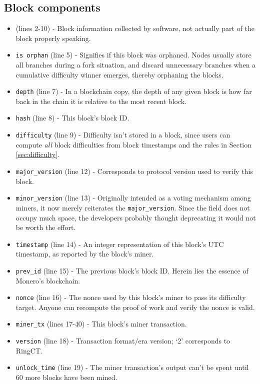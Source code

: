 \begin{appendices}
\section*{Block components}

\begin{itemize}
	\item (lines 2-10) - Block information collected by software, not actually part of the block properly speaking.
    \item {\tt is orphan} (line 5) - Signifies if this block was orphaned. Nodes usually store all branches during a fork situation, and discard unnecessary branches when a cumulative difficulty winner emerges, thereby orphaning the blocks.
    \item {\tt depth} (line 7) - In a blockchain copy, the depth of any given block is how far back in the chain it is relative to the most recent block.
    \item {\tt hash} (line 8) - This block's block ID.
    \item {\tt difficulty} (line 9) - Difficulty isn't stored in a block, since users can compute {\em all} block difficulties from block timestamps and the rules in Section \ref{sec:difficulty}.
    \item {\tt major\_version} (line 12) - Corresponds to protocol version used to verify this block.
    \item {\tt minor\_version} (line 13) - Originally intended as a voting mechanism among miners, it now merely reiterates the {\tt major\_version}. Since the field does not occupy much space, the developers probably thought deprecating it would not be worth the effort.
    \item {\tt timestamp} (line 14) - An integer representation of this block's UTC timestamp, as reported by the block's miner.
    \item {\tt prev\_id} (line 15) - The previous block's block ID. Herein lies the essence of Monero's blockchain.
    \item {\tt nonce} (line 16) - The nonce used by this block's miner to pass its difficulty target. Anyone can recompute the proof of work and verify the nonce is valid.
    \item {\tt miner\_tx} (lines 17-40) - This block's miner transaction.
    \item {\tt version} (line 18) - Transaction format/era version; `2' corresponds to RingCT.
    \item {\tt unlock\_time} (line 19) - The miner transaction's output can't be spent until 60 more blocks have been mined.

\end{itemize}
\end{appendices}
